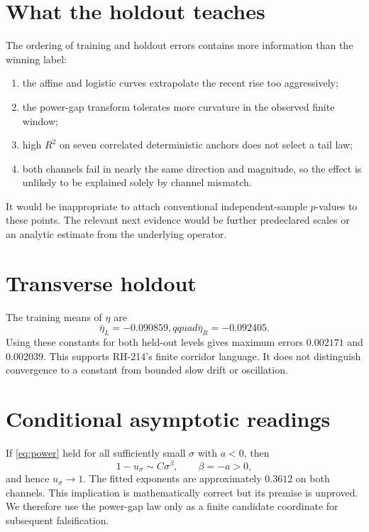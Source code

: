 \documentclass[12pt]{article}
\theoremstyle{remark}\newtheorem{remark}[theorem]{Remark}
\begin{document}
\section{What the holdout teaches}

The ordering of training and holdout errors contains more information than
the winning label:
\begin{enumerate}[leftmargin=2em]
\item the affine and logistic curves extrapolate the recent rise too
aggressively;
\item the power-gap transform tolerates more curvature in the observed
finite window;
\item high $R^2$ on seven correlated deterministic anchors does not select a
tail law;
\item both channels fail in nearly the same direction and magnitude, so the
effect is unlikely to be explained solely by channel mismatch.
\end{enumerate}

It would be inappropriate to attach conventional independent-sample
$p$-values to these points.  The relevant next evidence would be further
predeclared scales or an analytic estimate from the underlying operator.

\section{Transverse holdout}

The training means of $\eta$ are
\begin{equation}
 \bar\eta_L=-0.090859,qquad \bar\eta_R=-0.092405.
\end{equation}
Using these constants for both held-out levels gives maximum errors
$0.002171$ and $0.002039$.  This supports RH-214's finite corridor language.
It does not distinguish convergence to a constant from bounded slow drift or
oscillation.

\section{Conditional asymptotic readings}

If \eqref{eq:power} held for all sufficiently small $\sigma$ with $a<0$,
then
\begin{equation}
 1-u_\sigma\sim C\sigma^{\beta},\qquad \beta=-a>0,
\end{equation}
and hence $u_\sigma\to1$.  The fitted exponents are approximately $0.3612$
on both channels.  This implication is mathematically correct but its
premise is unproved.  We therefore use the power-gap law only as a finite
candidate coordinate for subsequent falsification.
\end{document}
